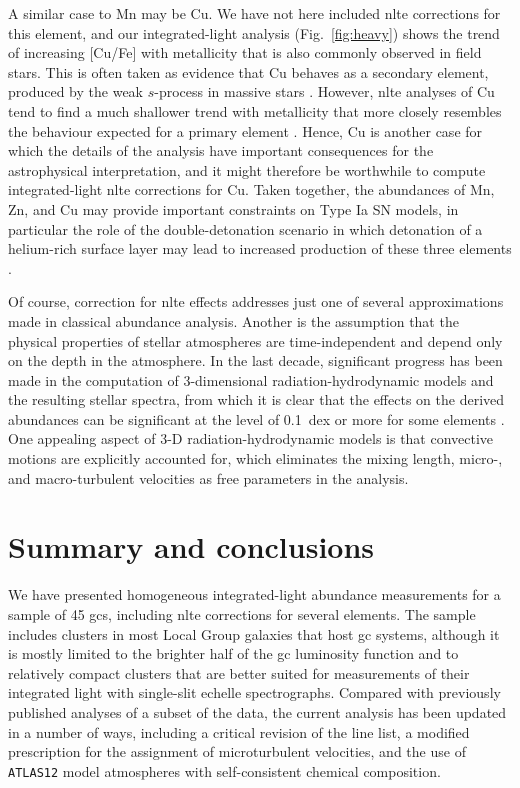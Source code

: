 \documentclass{aa}
\begin{document}
A similar case to Mn may be Cu. We have not here included \ac{nlte} corrections for this element, and our integrated-light analysis (Fig.~\ref{fig:heavy}) shows the trend of increasing [Cu/Fe] with metallicity that is also commonly observed in field stars. This is often taken as evidence that Cu behaves as a secondary element, produced by the weak $s$-process in massive stars \citep{Romano2007}. However, \ac{nlte} analyses of Cu tend to find a much shallower trend with metallicity that more closely resembles the behaviour expected for a primary element \citep{Yan2015,Korotin2018,Shi2018}. Hence, Cu is another case for which the details of the analysis have important consequences for the astrophysical interpretation, and it might therefore be worthwhile to compute integrated-light \ac{nlte} corrections for Cu. 
Taken together, the abundances of Mn, Zn, and Cu may provide important constraints on Type Ia SN models, in particular the role of the double-detonation scenario in which detonation of a helium-rich surface layer may lead to increased production of these three elements \citep{Lach2020}.

Of course, correction for \ac{nlte} effects addresses just one of several approximations made in classical abundance analysis.  Another is the assumption that the physical properties of stellar atmospheres are time-independent and depend only on the depth in the atmosphere. In the last decade, significant progress has been made in the computation of 3-dimensional radiation-hydrodynamic models \citep[e.g.][]{Magic2013} and the resulting stellar spectra, from which it is clear that the effects on the derived abundances can be significant at the level of 0.1~dex or more for some elements \citep[][]{Bergemann2019,Semenova2020,Amarsi2019}. 
One appealing aspect of 3-D radiation-hydrodynamic models is that convective motions are explicitly accounted for, which eliminates the mixing length,  micro-, and macro-turbulent velocities as free parameters in the analysis.


\section{Summary and conclusions}

We have presented homogeneous integrated-light abundance measurements for a sample of 45 \acp{gc}, including \ac{nlte} corrections for several elements. The sample includes clusters in most Local Group galaxies that host \ac{gc} systems, although it is mostly limited to the brighter half of the \ac{gc} luminosity function and to relatively compact clusters that are better suited for measurements of their integrated light with single-slit echelle spectrographs. Compared with previously published analyses of a subset of the data, the current analysis has been updated in a number of ways, including a critical revision of the line list, a modified prescription for the assignment of microturbulent velocities, and the use of \texttt{ATLAS12} model atmospheres with self-consistent chemical composition.
\end{document}
